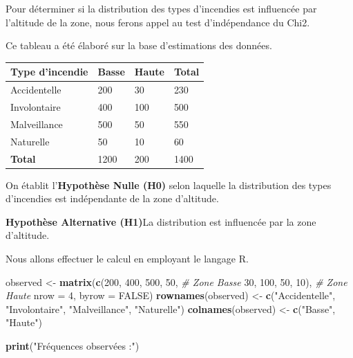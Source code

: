 \documentclass[
]{article}
\newenvironment{Shaded}{\begin{snugshade}}{\end{snugshade}}
\newcommand{\AttributeTok}[1]{\textcolor[rgb]{0.13,0.29,0.53}{#1}}
\newcommand{\CommentTok}[1]{\textcolor[rgb]{0.56,0.35,0.01}{\textit{#1}}}
\newcommand{\ConstantTok}[1]{\textcolor[rgb]{0.56,0.35,0.01}{#1}}
\newcommand{\DecValTok}[1]{\textcolor[rgb]{0.00,0.00,0.81}{#1}}
\newcommand{\FunctionTok}[1]{\textcolor[rgb]{0.13,0.29,0.53}{\textbf{#1}}}
\newcommand{\NormalTok}[1]{#1}
\newcommand{\OtherTok}[1]{\textcolor[rgb]{0.56,0.35,0.01}{#1}}
\newcommand{\StringTok}[1]{\textcolor[rgb]{0.31,0.60,0.02}{#1}}
\begin{document}
Pour déterminer si la distribution des types d'incendies est influencée
par l'altitude de la zone, nous ferons appel au test d'indépendance du
Chi2.

Ce tableau a été élaboré sur la base d'estimations des données.

\begin{longtable}[]{@{}llll@{}}
\toprule\noalign{}
\textbf{Type d'incendie} & \textbf{Basse} & \textbf{Haute} &
\textbf{Total} \\
\midrule\noalign{}
\endhead
\bottomrule\noalign{}
\endlastfoot
Accidentelle & 200 & 30 & 230 \\
Involontaire & 400 & 100 & 500 \\
Malveillance & 500 & 50 & 550 \\
Naturelle & 50 & 10 & 60 \\
\textbf{Total} & 1200 & 200 & 1400 \\
\end{longtable}

On établit l'\textbf{Hypothèse Nulle (H0)} selon laquelle la
distribution des types d'incendies est indépendante de la zone
d'altitude.

\textbf{Hypothèse Alternative (H1)}La distribution est influencée par la
zone d'altitude.

Nous allons effectuer le calcul en employant le langage R.

\begin{Shaded}
\begin{Highlighting}[]
\NormalTok{observed }\OtherTok{\textless{}{-}} \FunctionTok{matrix}\NormalTok{(}\FunctionTok{c}\NormalTok{(}\DecValTok{200}\NormalTok{, }\DecValTok{400}\NormalTok{, }\DecValTok{500}\NormalTok{, }\DecValTok{50}\NormalTok{,  }\CommentTok{\# Zone Basse}
                     \DecValTok{30}\NormalTok{, }\DecValTok{100}\NormalTok{, }\DecValTok{50}\NormalTok{, }\DecValTok{10}\NormalTok{),   }\CommentTok{\# Zone Haute}
                   \AttributeTok{nrow =} \DecValTok{4}\NormalTok{, }\AttributeTok{byrow =} \ConstantTok{FALSE}\NormalTok{)}
\FunctionTok{rownames}\NormalTok{(observed) }\OtherTok{\textless{}{-}} \FunctionTok{c}\NormalTok{(}\StringTok{"Accidentelle"}\NormalTok{, }\StringTok{"Involontaire"}\NormalTok{, }\StringTok{"Malveillance"}\NormalTok{, }\StringTok{"Naturelle"}\NormalTok{)}
\FunctionTok{colnames}\NormalTok{(observed) }\OtherTok{\textless{}{-}} \FunctionTok{c}\NormalTok{(}\StringTok{"Basse"}\NormalTok{, }\StringTok{"Haute"}\NormalTok{)}

\FunctionTok{print}\NormalTok{(}\StringTok{"Fréquences observées :"}\NormalTok{)}
\end{Highlighting}
\end{Shaded}
\end{document}
